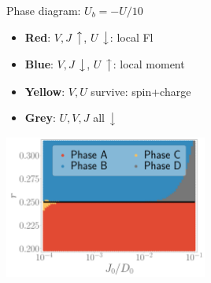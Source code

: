 \documentclass[11pt,aspectratio=169]{beamer}
\begin{document}
\begin{frame}{Phase diagram: \(U_b = -U/10\)}

\hspace*{-30pt}
\begin{minipage}{0.55\textwidth}
\begin{itemize}
	\item {\bf\color{orange}Red}: \(V,J\) \(\big\uparrow\), \(U\) \(\big\downarrow\): local Fl\\[10pt]
	\item {\bf\color{blue}Blue}: \(V,J\) \(\big\downarrow\), \(U\) \(\big\uparrow\): local moment
\end{itemize}
\end{minipage}
\begin{minipage}{0.5\textwidth}
\begin{itemize}
	\item {\bf\color{yellow}Yellow}: \(V,U\) survive: spin+charge\\[10pt]
	\item {\bf\color{gray}Grey}: \(U,V,J\) all \(\big\downarrow\)
\end{itemize}
\end{minipage}

\vspace*{\fill}

\includegraphics[width=0.5\textwidth]{figures/phase-map-MIT.pdf}
\end{frame}
\end{document}
